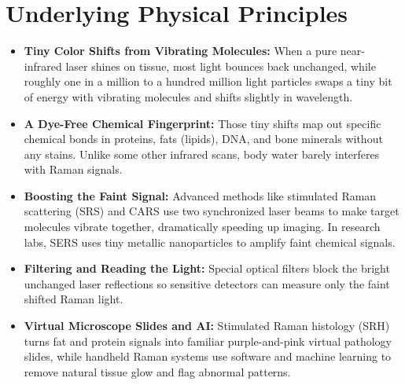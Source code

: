 \section{Underlying Physical Principles}
\begin{itemize}
  \item \textbf{Tiny Color Shifts from Vibrating Molecules:} When a pure near-infrared laser shines on tissue, most light bounces back unchanged, while roughly one in a million to a hundred million light particles swaps a tiny bit of energy with vibrating molecules and shifts slightly in wavelength.
  \item \textbf{A Dye-Free Chemical Fingerprint:} Those tiny shifts map out specific chemical bonds in proteins, fats (lipids), DNA, and bone minerals without any stains. Unlike some other infrared scans, body water barely interferes with Raman signals.
  \item \textbf{Boosting the Faint Signal:} Advanced methods like stimulated Raman scattering (SRS) and CARS use two synchronized laser beams to make target molecules vibrate together, dramatically speeding up imaging. In research labs, SERS uses tiny metallic nanoparticles to amplify faint chemical signals.
  \item \textbf{Filtering and Reading the Light:} Special optical filters block the bright unchanged laser reflections so sensitive detectors can measure only the faint shifted Raman light.
  \item \textbf{Virtual Microscope Slides and AI:} Stimulated Raman histology (SRH) turns fat and protein signals into familiar purple-and-pink virtual pathology slides, while handheld Raman systems use software and machine learning to remove natural tissue glow and flag abnormal patterns.
\end{itemize}

